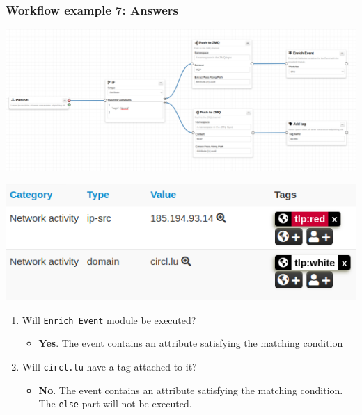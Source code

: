 \begin{frame}
    \frametitle{Workflow example 7: Answers}
    \begin{center}
        \includegraphics[width=0.7\linewidth]{pictures/example-7.png}
    \end{center}
    \begin{center}
        \includegraphics[width=0.3\linewidth]{pictures/event-1.png}
    \end{center}
    \begin{enumerate}
        \item Will \texttt{Enrich Event} module be executed?
        \begin{itemize}
            \item \textbf{Yes}. The event contains an attribute satisfying the matching condition
        \end{itemize}
        \item Will \texttt{circl.lu} have a tag attached to it?
        \begin{itemize}
            \item \textbf{No}. The event contains an attribute satisfying the matching condition. The \texttt{else} part will not be executed.
        \end{itemize}
    \end{enumerate}
\end{frame}

